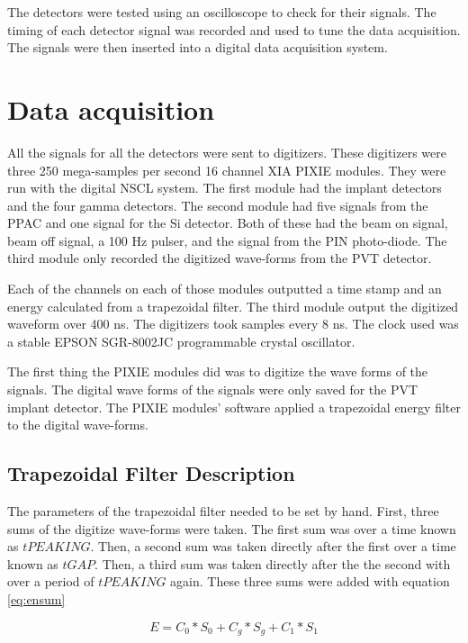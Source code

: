 \documentclass[main.tex]{subfiles}
\begin{document}
The detectors were tested using an oscilloscope to check for their signals.
The timing of each detector signal was recorded and used to tune the data acquisition. 
The signals were then inserted into a digital data acquisition system.

\section{Data acquisition}

All the signals for all the detectors were sent to digitizers.
These digitizers were three 250 mega-samples per second 16 channel XIA PIXIE modules. 
They were run with the digital NSCL system.
The first module had the implant detectors and the four gamma detectors. 
The second module had five signals from the PPAC and one signal for the Si detector. 
Both of these had the beam on signal, beam off signal, a 100 Hz pulser, and the signal from the PIN photo-diode. 
The third module only recorded the digitized wave-forms from the PVT detector.

Each of the channels on each of those modules outputted a time stamp and an energy calculated from a trapezoidal filter.
The third module output the digitized waveform over 400 ns.
The digitizers took samples every 8 ns.
The clock used was a stable EPSON SGR-8002JC programmable crystal oscillator.

The first thing the PIXIE modules did was to digitize the wave forms of the signals.
The digital wave forms of the signals were only saved for the PVT implant detector.
The PIXIE modules' software applied a trapezoidal energy filter to the digital wave-forms.

\subsection{Trapezoidal Filter Description}
The parameters of the trapezoidal filter needed to be set by hand.
First, three sums of the digitize wave-forms were taken.
The first sum was over a time known as $tPEAKING$.
Then, a second sum was taken directly after the first over a time known as $tGAP$.
Then, a third sum was taken directly after the the second with over a period of $tPEAKING$ again.
These three sums were added with equation \ref{eq:ensum}

\begin{equation}
	E = C_{0} * S_{0} + C_{g} * S_{g} + C_{1} * S_{1} 
	\label{eq:ensum}
\end{equation} 
\end{document}
